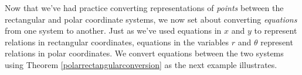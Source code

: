 \medskip

Now that we've had practice converting representations of \textit{points} between the rectangular and polar coordinate systems, we now set about converting \textit{equations} from one system to another.  Just as we've used equations in $x$ and $y$ to represent relations in rectangular coordinates, equations in the variables $r$ and $\theta$ represent relations in polar coordinates.  We convert equations between the two systems using Theorem \ref{polarrectangularconversion} as the next example illustrates.

\medskip

